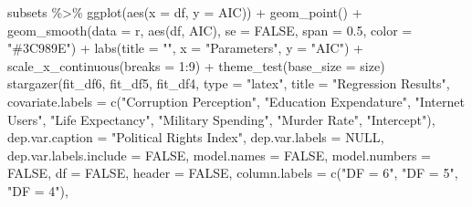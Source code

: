 \documentclass[
  english,
  man,floatsintext]{apa6}
\newenvironment{Shaded}{\begin{snugshade}}{\end{snugshade}}
\newcommand{\AttributeTok}[1]{\textcolor[rgb]{0.77,0.63,0.00}{#1}}
\newcommand{\ConstantTok}[1]{\textcolor[rgb]{0.00,0.00,0.00}{#1}}
\newcommand{\DecValTok}[1]{\textcolor[rgb]{0.00,0.00,0.81}{#1}}
\newcommand{\FloatTok}[1]{\textcolor[rgb]{0.00,0.00,0.81}{#1}}
\newcommand{\FunctionTok}[1]{\textcolor[rgb]{0.00,0.00,0.00}{#1}}
\newcommand{\NormalTok}[1]{#1}
\newcommand{\SpecialCharTok}[1]{\textcolor[rgb]{0.00,0.00,0.00}{#1}}
\newcommand{\StringTok}[1]{\textcolor[rgb]{0.31,0.60,0.02}{#1}}
\begin{document}
\begin{Shaded}
\begin{Highlighting}[]
\NormalTok{subsets }\SpecialCharTok{\%\textgreater{}\%} 
  \FunctionTok{ggplot}\NormalTok{(}\FunctionTok{aes}\NormalTok{(}\AttributeTok{x =}\NormalTok{ df, }\AttributeTok{y =}\NormalTok{ AIC)) }\SpecialCharTok{+} 
  \FunctionTok{geom\_point}\NormalTok{() }\SpecialCharTok{+} 
  \FunctionTok{geom\_smooth}\NormalTok{(}\AttributeTok{data =}\NormalTok{ r, }\FunctionTok{aes}\NormalTok{(df, AIC), }
              \AttributeTok{se =} \ConstantTok{FALSE}\NormalTok{, }\AttributeTok{span =} \FloatTok{0.5}\NormalTok{, }\AttributeTok{color =} \StringTok{"\#3C989E"}\NormalTok{) }\SpecialCharTok{+} 
  \FunctionTok{labs}\NormalTok{(}\AttributeTok{title =} \StringTok{""}\NormalTok{, }\AttributeTok{x =} \StringTok{"Parameters"}\NormalTok{, }\AttributeTok{y =} \StringTok{"AIC"}\NormalTok{) }\SpecialCharTok{+} 
  \FunctionTok{scale\_x\_continuous}\NormalTok{(}\AttributeTok{breaks =} \DecValTok{1}\SpecialCharTok{:}\DecValTok{9}\NormalTok{) }\SpecialCharTok{+} 
  \FunctionTok{theme\_test}\NormalTok{(}\AttributeTok{base\_size =}\NormalTok{ size) }
\FunctionTok{stargazer}\NormalTok{(fit\_df6, fit\_df5, fit\_df4, }
                     \AttributeTok{type =} \StringTok{"latex"}\NormalTok{, }
                     \AttributeTok{title =} \StringTok{"Regression Results"}\NormalTok{, }
                     \AttributeTok{covariate.labels =} \FunctionTok{c}\NormalTok{(}\StringTok{"Corruption Perception"}\NormalTok{, }
                                          \StringTok{"Education Expendature"}\NormalTok{,}
                                          \StringTok{"Internet Users"}\NormalTok{, }
                                          \StringTok{"Life Expectancy"}\NormalTok{,}
                                          \StringTok{"Military Spending"}\NormalTok{, }
                                          \StringTok{"Murder Rate"}\NormalTok{, }
                                          \StringTok{"Intercept"}\NormalTok{),}
                     \AttributeTok{dep.var.caption =} \StringTok{"Political Rights Index"}\NormalTok{,}
                     \AttributeTok{dep.var.labels =} \ConstantTok{NULL}\NormalTok{,}
                     \AttributeTok{dep.var.labels.include =} \ConstantTok{FALSE}\NormalTok{, }
                     \AttributeTok{model.names =} \ConstantTok{FALSE}\NormalTok{,}
                     \AttributeTok{model.numbers =} \ConstantTok{FALSE}\NormalTok{,}
                     \AttributeTok{df =} \ConstantTok{FALSE}\NormalTok{, }
                     \AttributeTok{header =} \ConstantTok{FALSE}\NormalTok{,}
                     \AttributeTok{column.labels =} \FunctionTok{c}\NormalTok{(}\StringTok{"DF = 6"}\NormalTok{, }\StringTok{"DF = 5"}\NormalTok{, }\StringTok{"DF = 4"}\NormalTok{),}

\end{Highlighting}
\end{Shaded}
\end{document}
